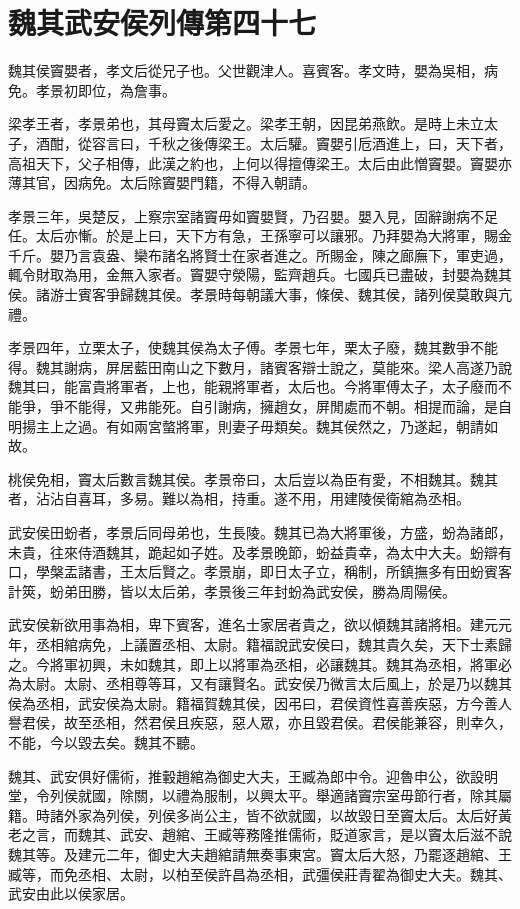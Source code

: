\chapter{魏其武安侯列傳第四十七}

魏其侯竇嬰者，孝文后從兄子也。父世觀津人。喜賓客。孝文時，嬰為吳相，病免。孝景初即位，為詹事。

梁孝王者，孝景弟也，其母竇太后愛之。梁孝王朝，因昆弟燕飲。是時上未立太子，酒酣，從容言曰，千秋之後傳梁王。太后驩。竇嬰引卮酒進上，曰，天下者，高祖天下，父子相傳，此漢之約也，上何以得擅傳梁王。太后由此憎竇嬰。竇嬰亦薄其官，因病免。太后除竇嬰門籍，不得入朝請。

孝景三年，吳楚反，上察宗室諸竇毋如竇嬰賢，乃召嬰。嬰入見，固辭謝病不足任。太后亦慚。於是上曰，天下方有急，王孫寧可以讓邪。乃拜嬰為大將軍，賜金千斤。嬰乃言袁盎、欒布諸名將賢士在家者進之。所賜金，陳之廊廡下，軍吏過，輒令財取為用，金無入家者。竇嬰守滎陽，監齊趙兵。七國兵已盡破，封嬰為魏其侯。諸游士賓客爭歸魏其侯。孝景時每朝議大事，條侯、魏其侯，諸列侯莫敢與亢禮。

孝景四年，立栗太子，使魏其侯為太子傅。孝景七年，栗太子廢，魏其數爭不能得。魏其謝病，屏居藍田南山之下數月，諸賓客辯士說之，莫能來。梁人高遂乃說魏其曰，能富貴將軍者，上也，能親將軍者，太后也。今將軍傅太子，太子廢而不能爭，爭不能得，又弗能死。自引謝病，擁趙女，屏閒處而不朝。相提而論，是自明揚主上之過。有如兩宮螫將軍，則妻子毋類矣。魏其侯然之，乃遂起，朝請如故。

桃侯免相，竇太后數言魏其侯。孝景帝曰，太后豈以為臣有愛，不相魏其。魏其者，沾沾自喜耳，多易。難以為相，持重。遂不用，用建陵侯衛綰為丞相。

武安侯田蚡者，孝景后同母弟也，生長陵。魏其已為大將軍後，方盛，蚡為諸郎，未貴，往來侍酒魏其，跪起如子姓。及孝景晚節，蚡益貴幸，為太中大夫。蚡辯有口，學槃盂諸書，王太后賢之。孝景崩，即日太子立，稱制，所鎮撫多有田蚡賓客計筴，蚡弟田勝，皆以太后弟，孝景後三年封蚡為武安侯，勝為周陽侯。

武安侯新欲用事為相，卑下賓客，進名士家居者貴之，欲以傾魏其諸將相。建元元年，丞相綰病免，上議置丞相、太尉。籍福說武安侯曰，魏其貴久矣，天下士素歸之。今將軍初興，未如魏其，即上以將軍為丞相，必讓魏其。魏其為丞相，將軍必為太尉。太尉、丞相尊等耳，又有讓賢名。武安侯乃微言太后風上，於是乃以魏其侯為丞相，武安侯為太尉。籍福賀魏其侯，因弔曰，君侯資性喜善疾惡，方今善人譽君侯，故至丞相，然君侯且疾惡，惡人眾，亦且毀君侯。君侯能兼容，則幸久，不能，今以毀去矣。魏其不聽。

魏其、武安俱好儒術，推轂趙綰為御史大夫，王臧為郎中令。迎魯申公，欲設明堂，令列侯就國，除關，以禮為服制，以興太平。舉適諸竇宗室毋節行者，除其屬籍。時諸外家為列侯，列侯多尚公主，皆不欲就國，以故毀日至竇太后。太后好黃老之言，而魏其、武安、趙綰、王臧等務隆推儒術，貶道家言，是以竇太后滋不說魏其等。及建元二年，御史大夫趙綰請無奏事東宮。竇太后大怒，乃罷逐趙綰、王臧等，而免丞相、太尉，以柏至侯許昌為丞相，武彊侯莊青翟為御史大夫。魏其、武安由此以侯家居。

